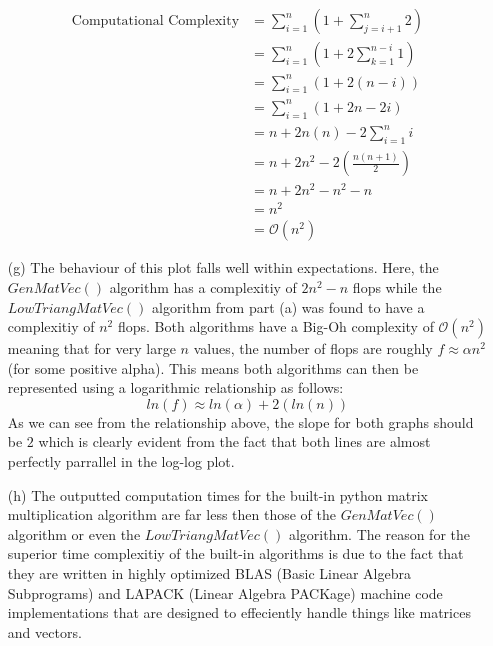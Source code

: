 \documentclass{article}
\begin{document}
\begin{enumerate}
                \begin{align*}
                                       \text{Computational Complexity} &= \sum_{i=1}^{n} \left(1 + \sum_{j=i+1}^{n}2 \right)\\
                                                                       &= \sum_{i=1}^{n} \left(1 + 2\sum_{k=1}^{n-i}1 \right)\\
                                                                       &= \sum_{i=1}^{n} \left(1 + 2(n-i) \right)\\
                                                                       &= \sum_{i=1}^{n} \left(1 + 2n - 2i \right)\\
                                                                       &= n + 2n(n) -2\sum_{i=1}^{n}i\\
                                                                       &= n + 2n^{2} -2\left(\frac{n(n+1)}{2}\right)\\
                                                                       &= n + 2n^{2} -n^{2} - n\\
                                                                       &= n^{2}\\
                                                                       &= \mathcal{O}(n^{2})                                         
                \end{align*}
    
    \item[(g)]  The behaviour of this plot falls well within expectations. Here, the $GenMatVec()$ algorithm has a complexitiy of
                $2n^{2}-n$ flops while the $LowTriangMatVec()$ algorithm from part (a) was found to have a complexitiy of $n^{2}$ flops.
                Both algorithms have a Big-Oh complexity of $\mathcal{O}(n^{2})$ meaning that for very large $n$ values, the number of
                flops are roughly $f \approx \alpha n^{2}$ (for some positive alpha). This means both algorithms can then be represented
                using a logarithmic relationship as follows:
                \begin{equation*}
                    ln(f) \approx ln(\alpha) + 2(ln(n))
                \end{equation*}
                As we can see from the relationship above, the slope for both graphs should be $2$ which is clearly evident from the
                fact that both lines are almost perfectly parrallel in the log-log plot.
    
    \item[(h)]  The outputted computation times for the built-in python matrix multiplication algorithm are far less then those of
                the $GenMatVec()$ algorithm or even the $LowTriangMatVec()$ algorithm. The reason for the superior time complexitiy
                of the built-in algorithms is due to the fact that they are written in highly optimized
                BLAS (Basic Linear Algebra Subprograms) and LAPACK (Linear Algebra PACKage) machine code implementations that
                are designed to effeciently handle things like matrices and vectors.

\end{enumerate}
\end{document}
